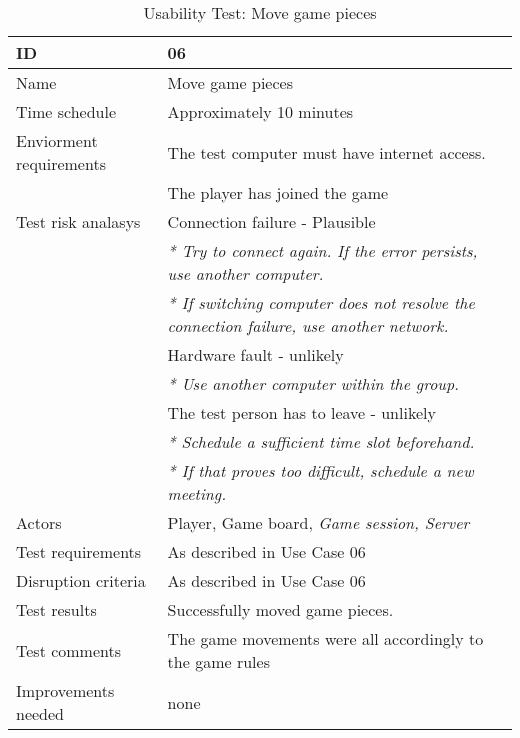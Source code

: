 {\footnotesize
\begin{table}[H]
\begin{tabular}{| p{5cm} | p{10cm} |}\hline
	\textbf{ID}	& \textbf{06} \\ \hline
	Name		& Move game pieces\\ \hline
	Time schedule	& Approximately 10 minutes\\ \hline
	Enviorment requirements 
		& The test computer must have internet access. \\ 
		& The player has joined the game\\ \hline
	Test risk analasys 
		& Connection failure - Plausible \\
		& \emph{* Try to connect again. If the error persists, use another computer.} \\
		& \emph{* If switching computer does not resolve the connection failure, use another network.}\\
		& Hardware fault - unlikely \\
		& \emph{* Use another computer within the group.} \\
		& The test person has to leave - unlikely \\
		& \emph{* Schedule a sufficient time slot beforehand.} \\
		& \emph{* If that proves too difficult, schedule a new meeting.}\\ \hline
	Actors	& Player, Game board, \emph{Game session, Server}\\ \hline
	Test requirements & As described in Use Case 06 \\ \hline
	Disruption criteria & As described in Use Case 06  \\ \hline
	Test results & Successfully moved game pieces. \\ \hline
	Test comments & The game movements were all accordingly to the game rules \\ \hline
	Improvements needed & none \\ \hline
\end{tabular}


\caption{Usability Test: Move game pieces}
\label{fig:usability_test_6}
\end{table}}


